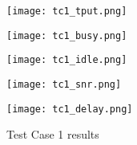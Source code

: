 
\begin{figure}[!ht]
    \centering
    \begin{minipage}[b]{0.48\textwidth}
        \centering
        \texttt{[image: tc1\_tput.png]}
        \label{fig:tc1:tput}
    \end{minipage}
    \hfill
    \begin{minipage}[b]{0.48\textwidth}
        \centering
        \texttt{[image: tc1\_busy.png]}
        \label{fig:tc1:busy}
    \end{minipage}
    
    \vspace{0.1em}
    
    \begin{minipage}[b]{0.48\textwidth}
        \centering
        \texttt{[image: tc1\_idle.png]}
        \label{fig:tc1:idle}
    \end{minipage}
    \hfill
    \begin{minipage}[b]{0.48\textwidth}
        \centering
        \texttt{[image: tc1\_snr.png]}
        \label{fig:tc1:snr}
    \end{minipage}
    
    \vspace{0.1em}
    
    \begin{minipage}[b]{0.48\textwidth}
        \centering
        \texttt{[image: tc1\_delay.png]}
        \label{fig:tc1:l3delay}
    \end{minipage}
    
    \caption{Test Case 1 results}
    \label{fig:tc1:plots}
\end{figure}


